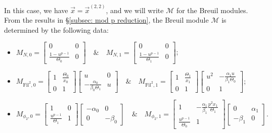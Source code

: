 \documentclass[11pt]{amsart}
\theoremstyle{definition}
\numberwithin{equation}{subsection}
\theoremstyle{plain}
\theoremstyle{plain}
\theoremstyle{plain}
\theoremstyle{plain}
\theoremstyle{plain}
\theoremstyle{plain}
\theoremstyle{plain}
\theoremstyle{plain}
\theoremstyle{plain}
\theoremstyle{plain}
\theoremstyle{plain}
\theoremstyle{plain}
\theoremstyle{definition}
\theoremstyle{definition}
\theoremstyle{definition}
\theoremstyle{remark}
\renewcommand{\(}{\textup{(}}
\renewcommand{\)}{\textup{)}}
\newcommand{\cM}{\mathcal{M}}
\newcommand{\Fil}{\mathrm{Fil}}
\newcommand{\vx}{\vec{x}}
\begin{document}
In this case, we have $\vx=\vx^{(2,2)}$, and we will write $\cM$ for the Breuil modules. From the results in \S\ref{subsec: mod p reduction}, the Breuil module $\cM$ is determined by the following data:
\begin{itemize}[leftmargin=*]
  \item $M_{N,0}=
  \begin{bmatrix}
    0 & 0 \\
    \frac{1-u^{p-1}}{\Theta_0} & 0
  \end{bmatrix}\quad\&\quad
  M_{N,1}=
  \begin{bmatrix}
    0 & 0 \\
    \frac{1-u^{p-1}}{\Theta_1} & 0
  \end{bmatrix}$;
  \item $M_{\Fil^2,0}=
  \begin{bmatrix}
    1 & \frac{\Theta_0}{x_0} \\
    0 & 1
  \end{bmatrix}
  \begin{bmatrix}
    u & 0 \\
    -\frac{\alpha_0}{\beta_0\Theta_1} & u
  \end{bmatrix}\quad\&\quad
  M_{\Fil^2,1}=
  \begin{bmatrix}
    1 & \frac{\Theta_1}{x_1} \\
    0 & 1
  \end{bmatrix}
  \begin{bmatrix}
    u^2 & -\frac{\alpha_1 u}{\beta_1\Theta_0} \\
    0 & 1
  \end{bmatrix}$;
  \item $M_{\phi_2,0}=
  \begin{bmatrix}
    1 & 0 \\
    \frac{u^{p-1}}{\Theta_1} & 1
  \end{bmatrix}
  \begin{bmatrix}
    -\alpha_0 & 0 \\
    0 & -\beta_0
  \end{bmatrix}\quad\&\quad
  M_{\phi_2,1}=
  \begin{bmatrix}
    1 & -\frac{\alpha_1}{\beta_1}\frac{p^2x_1}{\Theta_1} \\
    \frac{u^{p-1}}{\Theta_0} & 1
  \end{bmatrix}
  \begin{bmatrix}
    0 & \alpha_1\\
    -\beta_1 & 0
  \end{bmatrix}.$
\end{itemize}
\end{document}
